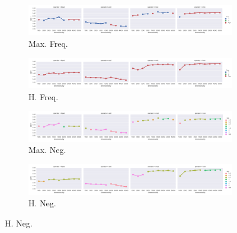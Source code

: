 

\begin{landscape}

\begin{figure}
  \centering

  \begin{subfigure}[t]{0.7\textwidth}
    \includegraphics[width=\textwidth]{supplement/figures/GS11-max_-selection-freq}
    \caption{Max. Freq.}
    \label{fig:}
  \end{subfigure}
  \begin{subfigure}[t]{0.7\textwidth}
    \includegraphics[width=\textwidth]{supplement/figures/GS11-heuristics-selection-freq}
    \caption{H. Freq.}
    \label{fig:}
  \end{subfigure}

  \begin{subfigure}[t]{0.7\textwidth}
    \includegraphics[width=\textwidth]{supplement/figures/GS11-max_-selection-neg}
    \caption{Max. Neg.}
    \label{fig:}
  \end{subfigure}
  \begin{subfigure}[t]{0.7\textwidth}
    \includegraphics[width=\textwidth]{supplement/figures/GS11-heuristics-selection-neg}
    \caption{H. Neg.}
    \label{fig:}
  \end{subfigure}


\end{figure}
\end{landscape}
